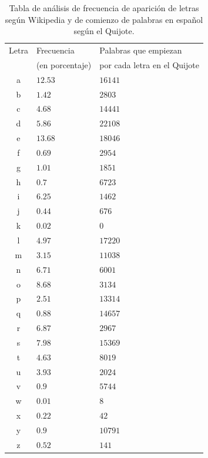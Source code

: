\documentclass[12pt]{article}
\begin{document}
    \begin{table}
        \centering
        \begin{tabular}{|c|l|l|}
            \hline
            Letra & Frecuencia & Palabras que empiezan\\
            & (en porcentaje) & por cada letra en el Quijote\\
            \hline
            a & $12.53$ & $16141$ \\
            b & $1.42$ & $2803$ \\
            c & $4.68$ & $14441$ \\
            d & $5.86$ & $22108$ \\
            e & $13.68$ & $18046$ \\
            f & $0.69$ & $2954$ \\
            g & $1.01$ & $1851$ \\
            h & $0.7$ & $6723$ \\
            i & $6.25$ & $1462$ \\
            j & $0.44$ & $676$ \\
            k & $0.02$ & $0$ \\
            l & $4.97$ & $17220$ \\
            m & $3.15$ & $11038$ \\
            n & $6.71$ & $6001$ \\
            o & $8.68$ & $3134$ \\
            p & $2.51$ & $13314$ \\
            q & $0.88$ & $14657$ \\
            r & $6.87$ & $2967$ \\
            s & $7.98$ & $15369$ \\
            t & $4.63$ & $8019$ \\
            u & $3.93$ & $2024$ \\
            v & $0.9$ & $5744$ \\
            w & $0.01$ & $8$ \\
            x & $0.22$ & $42$ \\
            y & $0.9$ & $10791$ \\
            z & $0.52$ & $141$ \\
            \hline
        \end{tabular}
        \caption{\centering Tabla de análisis de frecuencia de aparición de letras según Wikipedia y de comienzo de palabras en español según el Quijote.}
        \label{tab:freq_wikipedia}
    \end{table}
\end{document}
